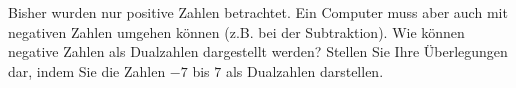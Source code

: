 \begin{exercise}[subtitle={Zusatzaufgabe}]
Bisher wurden nur positive Zahlen betrachtet. Ein Computer muss aber auch mit negativen Zahlen umgehen können (z.B. bei der Subtraktion). Wie können negative Zahlen als Dualzahlen dargestellt werden? Stellen Sie Ihre Überlegungen dar, indem Sie die Zahlen $-7$ bis $7$ als Dualzahlen darstellen.
\end{exercise}
